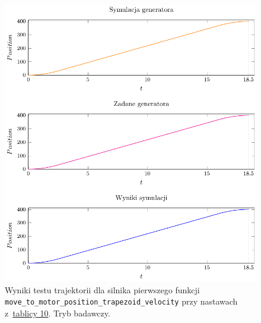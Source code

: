 \documentclass[a4paper, 12pt]{article}
\begin{document}
	\begin{figure}[H]
		\centering
		\includegraphics[scale=1.1]{raport_graphs/simpMPVR.pdf}
		\caption{Wyniki testu trajektorii dla silnika pierwszego funkcji \texttt{move\_to\_motor\_position\_trapezoid\_velocity} przy nastawach z~\hyperref[tab:setup3]{tablicy 10}. Tryb badawczy.}
		\label{fig:simpMPVR}
	\end{figure}
	
\end{document}
